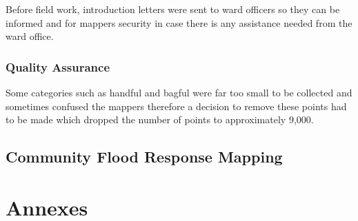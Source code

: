 \documentclass[a4paper,12pt,twoside]{article}
\begin{document}
Before field work, introduction letters were sent to ward officers so they can be informed and for mappers security in case there is any assistance needed from the ward office.

\subsubsection{Quality Assurance}
Some categories such as handful and bagful were far too small to be collected and sometimes confused the mappers therefore a decision to remove these points had to be made which dropped the number of points to approximately 9,000.

\newpage
\subsection{Community Flood Response Mapping}

\newpage
\section{Annexes}
\end{document}
